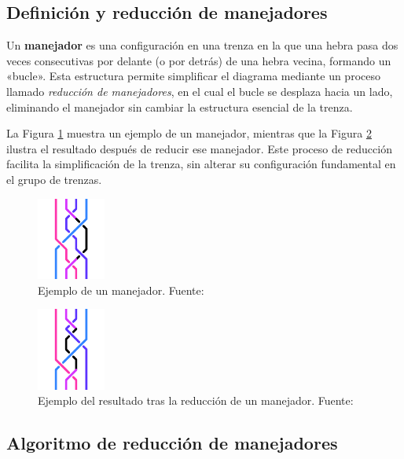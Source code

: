 \subsection{Definición y reducción de manejadores}

Un \textbf{manejador} es una configuración en una trenza en la que una hebra pasa dos veces consecutivas por delante (o por detrás) de una hebra vecina, formando un «bucle». Esta estructura permite simplificar el diagrama mediante un proceso llamado \textit{reducción de manejadores}, en el cual el bucle se desplaza hacia un lado, eliminando el manejador sin cambiar la estructura esencial de la trenza.

La Figura \ref{fig:handle_state_1} muestra un ejemplo de un manejador, mientras que la Figura \ref{fig:handle_state_2} ilustra el resultado después de reducir ese manejador. Este proceso de reducción facilita la simplificación de la trenza, sin alterar su configuración fundamental en el grupo de trenzas.

\begin{figure}[h!]
    \centering
    \includegraphics[width=0.2\textwidth]{figures/chapters/3_algoritmos/handle_state_1.png}
    \caption{Ejemplo de un manejador. Fuente: \cite{noauthor_braids_nodate}}
    \label{fig:handle_state_1}
\end{figure}

\begin{figure}[h!]
    \centering
    \includegraphics[width=0.2\textwidth]{figures/chapters/3_algoritmos/handle_state_2.png}
    \caption{Ejemplo del resultado tras la reducción de un manejador. Fuente: \cite{noauthor_braids_nodate}}
    \label{fig:handle_state_2}
\end{figure}

\subsection{Algoritmo de reducción de manejadores}


